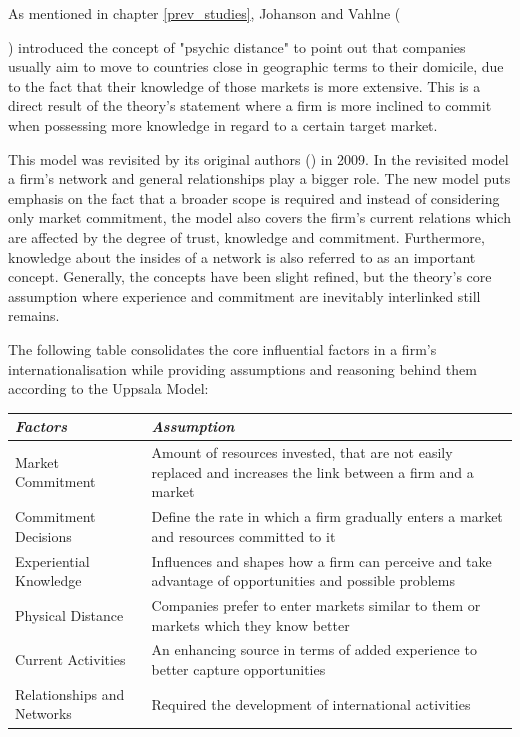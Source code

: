 \documentclass[11pt,a4paper]{article}
\begin{document}
As mentioned in chapter \ref{prev_studies}, Johanson and Vahlne ({\citeyear{johansonInternationalizationProcessFirm1977}) introduced the concept of "psychic distance" to point out that companies usually aim to move to countries close in geographic terms to their domicile, due to the fact that their knowledge of those markets is more extensive. This is a direct result of the theory's statement where a firm is more inclined to commit when possessing more knowledge in regard to a certain target market. \par
This model was revisited by its original authors (\citeauthor{johansonUppsalaInternationalizationProcess2009}) in 2009. In the revisited model a firm's network and general relationships play a bigger role. The new model puts emphasis on the fact that a broader scope is required and instead of considering only market commitment, the model also covers the firm's current relations which are affected by the degree of trust, knowledge and commitment. Furthermore, knowledge about the insides of a network is also referred to as an important concept. Generally, the concepts have been slight refined, but the theory's core assumption where experience and commitment are inevitably interlinked still remains. \par
The following table consolidates the core influential factors in a firm's internationalisation while providing assumptions and reasoning behind them according to the Uppsala Model:

\vspace{8mm}
\begin{table}[H] \centering 
\begin{tabular}{p{5cm}p{10cm}}
  \toprule
  \emph{Factors} & \emph{Assumption}  \\ 
    \midrule
  Market Commitment & Amount of resources invested, that are not easily replaced and increases the link between a firm and a market \\
                  Commitment Decisions & Define the rate in which a firm gradually enters a market and resources committed to it \\
    Experiential Knowledge & Influences and shapes how a firm can perceive and take advantage of opportunities and possible problems \\
        Physical Distance & Companies prefer to enter markets similar to them or markets which they know better \\
                Current Activities & An enhancing source in terms of added experience to better capture opportunities \\
                Relationships and Networks & Required the development of international activities \\
              

\end{tabular}
\end{table}}
\end{document}
